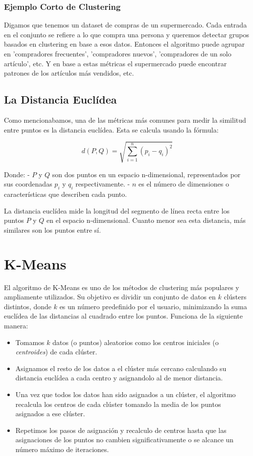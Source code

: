 \subsubsection{Ejemplo Corto de Clustering}

Digamos que tenemos un dataset de compras de un supermercado. Cada
entrada en el conjunto se refiere a lo que compra una persona y queremos
detectar grupos basados en clustering en base a esos datos. Entonces el
algoritmo puede agrupar en 'compradores frecuentes', 'compradores
nuevos', 'compradores de un solo artículo', etc. Y en base a estas
métricas el supermercado puede encontrar patrones de los artículos más
vendidos, etc.

\subsection{La Distancia Euclídea}

Como mencionabamos, una de las métricas más comunes para medir la
similitud entre puntos es la distancia euclídea. Esta se calcula usando
la fórmula:

\[d(P, Q) = \sqrt{\sum_{i=1}^{n} (p_i - q_i)^2}\]

Donde: - \(P\) y \(Q\) son dos puntos en un espacio n-dimensional,
representados por sus coordenadas \(p_i\) y \(q_i\) respectivamente. -
\(n\) es el número de dimensiones o características que describen cada
punto.

La distancia euclídea mide la longitud del segmento de línea recta entre
los puntos \(P\) y \(Q\) en el espacio n-dimensional. Cuanto menor sea
esta distancia, más similares son los puntos entre sí.

\section{K-Means}

El algoritmo de K-Means es uno de los métodos de clustering más
populares y ampliamente utilizados. Su objetivo es dividir un conjunto
de datos en \(k\) clústers distintos, donde \(k\) es un número
predefinido por el usuario, minimizando la suma euclídea de las
distancias al cuadrado entre los puntos. Funciona de la siguiente
manera:

\begin{itemize}
\item
  Tomamos \(k\) datos (o puntos) aleatorios como los centros iniciales
  (o \emph{centroides}) de cada clúster.
\item
  Asignamos el resto de los datos a el clúster más cercano calculando su
  distancia euclídea a cada centro y asignandolo al de menor distancia.
\item
  Una vez que todos los datos han sido asignados a un clúster, el
  algoritmo recalcula los centros de cada clúster tomando la media de
  los puntos asignados a ese clúster.
\item
  Repetimos los pasos de asignación y recalculo de centros hasta que las
  asignaciones de los puntos no cambien significativamente o se alcance
  un número máximo de iteraciones.
\end{itemize}

